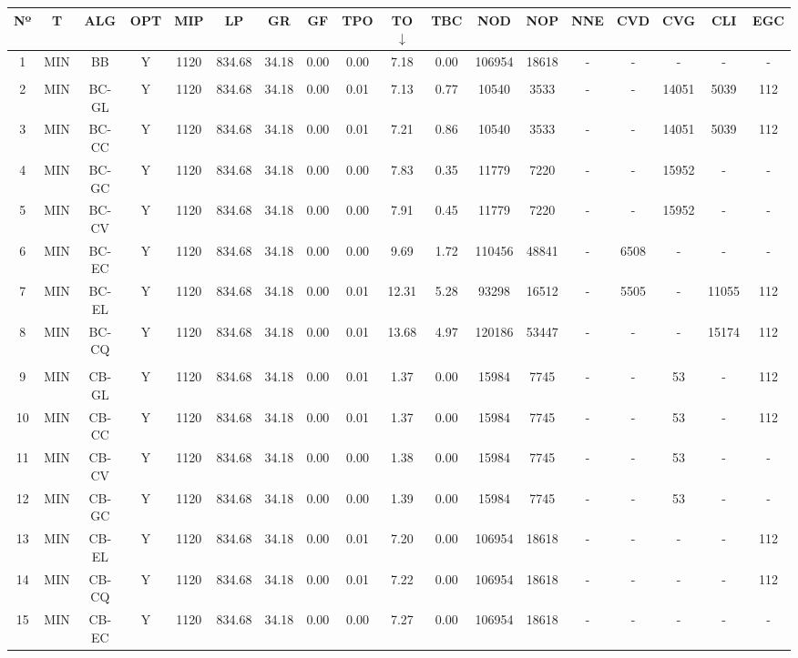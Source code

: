 {
\footnotesize\centering
\hspace*{-5mm}\begin{tabular}{ *{17}{c|} c }
\hline
\textbf{Nº} & \textbf{T} & \textbf{ALG} & \textbf{OPT} & \textbf{MIP} & \textbf{LP} & \textbf{GR} & \textbf{GF} & \textbf{TPO} & \textbf{TO} $\downarrow$ & \textbf{TBC} & \textbf{NOD} & \textbf{NOP} & \textbf{NNE} & \textbf{CVD} & \textbf{CVG} & \textbf{CLI} & \textbf{EGC}\\
\hline
1 & MIN & BB & Y & 1120 & 834.68 & 34.18 & 0.00 & 0.00 & 7.18 & 0.00 & 106954 & 18618 & - & - & - & - & -\\
\hline
\multicolumn{18}{c}{}
\\
\hline
2 & MIN & BC-GL & Y & 1120 & 834.68 & 34.18 & 0.00 & 0.01 & 7.13 & 0.77 & 10540 & 3533 & - & - & 14051 & 5039 & 112\\
\hline
3 & MIN & BC-CC & Y & 1120 & 834.68 & 34.18 & 0.00 & 0.01 & 7.21 & 0.86 & 10540 & 3533 & - & - & 14051 & 5039 & 112\\
\hline
4 & MIN & BC-GC & Y & 1120 & 834.68 & 34.18 & 0.00 & 0.00 & 7.83 & 0.35 & 11779 & 7220 & - & - & 15952 & - & -\\
\hline
5 & MIN & BC-CV & Y & 1120 & 834.68 & 34.18 & 0.00 & 0.00 & 7.91 & 0.45 & 11779 & 7220 & - & - & 15952 & - & -\\
\hline
6 & MIN & BC-EC & Y & 1120 & 834.68 & 34.18 & 0.00 & 0.00 & 9.69 & 1.72 & 110456 & 48841 & - & 6508 & - & - & -\\
\hline
7 & MIN & BC-EL & Y & 1120 & 834.68 & 34.18 & 0.00 & 0.01 & 12.31 & 5.28 & 93298 & 16512 & - & 5505 & - & 11055 & 112\\
\hline
8 & MIN & BC-CQ & Y & 1120 & 834.68 & 34.18 & 0.00 & 0.01 & 13.68 & 4.97 & 120186 & 53447 & - & - & - & 15174 & 112\\
\hline
\multicolumn{18}{c}{}
\\
\hline
9 & MIN & CB-GL & Y & 1120 & 834.68 & 34.18 & 0.00 & 0.01 & 1.37 & 0.00 & 15984 & 7745 & - & - & 53 & - & 112\\
\hline
10 & MIN & CB-CC & Y & 1120 & 834.68 & 34.18 & 0.00 & 0.01 & 1.37 & 0.00 & 15984 & 7745 & - & - & 53 & - & 112\\
\hline
11 & MIN & CB-CV & Y & 1120 & 834.68 & 34.18 & 0.00 & 0.00 & 1.38 & 0.00 & 15984 & 7745 & - & - & 53 & - & -\\
\hline
12 & MIN & CB-GC & Y & 1120 & 834.68 & 34.18 & 0.00 & 0.00 & 1.39 & 0.00 & 15984 & 7745 & - & - & 53 & - & -\\
\hline
13 & MIN & CB-EL & Y & 1120 & 834.68 & 34.18 & 0.00 & 0.01 & 7.20 & 0.00 & 106954 & 18618 & - & - & - & - & 112\\
\hline
14 & MIN & CB-CQ & Y & 1120 & 834.68 & 34.18 & 0.00 & 0.01 & 7.22 & 0.00 & 106954 & 18618 & - & - & - & - & 112\\
\hline
15 & MIN & CB-EC & Y & 1120 & 834.68 & 34.18 & 0.00 & 0.00 & 7.27 & 0.00 & 106954 & 18618 & - & - & - & - & -\\
\hline
\end{tabular}\\
\vspace{4mm}
}


